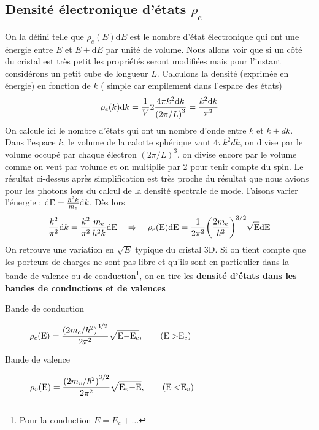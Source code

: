 	\subsection{Densité électronique d'états $\rho_e$}	
	On la défini telle que $\rho_e(E)\text{d}E$ est le nombre d'état électronique qui ont une 
	énergie entre $E$ et $E+\text{d}E$ par unité de volume. Nous allons voir que si un côté du 
	cristal est très petit les propriétés seront modifiées mais pour l'instant considérons un 
	petit cube de longueur $L$. Calculons la densité (exprimée en énergie) en fonction de $k$ (
	simple car empilement dans l'espace des états)
	\begin{equation}
	{\rho _e}(k){\rm{d}}k = \frac{1}{V}2\frac{{4\pi {k^2}{\rm{d}}k}}{{{{(2\pi /L)}^3}}} = \frac{{{k^2}{\rm{d}}k}}{{{\pi ^2}}}
	\end{equation}
	On calcule ici le nombre d'états qui ont un nombre d'onde entre $k$ et $k+dk$. Dans l'espace 
	$k$, le volume de la calotte sphérique vaut $4\pi k^2dk$, on divise par le volume occupé par 
	chaque électron $(2\pi/L)^3$, on divise encore par le volume comme on veut par volume et on 
	multiplie par 2 pour tenir compte du spin. Le résultat ci-dessus après simplification est très
	proche du résultat que nous avions pour les photons lors du calcul de la densité spectrale de 
	mode. Faisons varier l'énergie : ${\rm{dE}} = \frac{{{\hbar ^2}k}}{{{m_e}}}{\rm{d}}k$. Dès lors
	\begin{equation}
	\frac{{{k^2}}}{{{\pi ^2}}}{\rm{d}}k = \frac{{{k^2}}}{{{\pi ^2}}}\frac{{{m_e}}}{{{\hbar ^2}k}}{\rm{dE}}\quad\Rightarrow\quad {\rho _e}({\rm{E}}){\rm{dE}} = \frac{1}{{2{\pi ^2}}}{\left( {\frac{{2{m_e}}}{{{\hbar ^2}}}} \right)^{3/2}}\sqrt {\rm{E}} {\rm{dE}}
	\end{equation}
	On retrouve une variation en $\sqrt{E}$ typique du cristal 3D. Si on tient compte que les 
	porteurs de charges ne sont pas libre et qu'ils sont en particulier dans la bande de valence 
	ou de conduction\footnote{Pour la conduction $E=E_c+\dots$}, on en tire les \textbf{densité 
	d'états dans les bandes de conductions et de valences}
	\begin{description}
	\item[Bande de conduction] $\displaystyle {\rho _c}({\rm{E}}) = \frac{{{{(2{m_c}/{\hbar ^2})}^{3/2}}}}
	{{2{\pi ^2}}}\sqrt {{\rm{E - }}{{\rm{E}}_c}} ,{\rm{     \qquad( E  >  }}{{\rm{E}}_c})$
	\item[Bande de valence]	$\displaystyle {\rho _v}({\rm{E}}) = \frac{{{{(2{m_v}/{\hbar ^2})}^{3/2}}}}{{2{\pi ^2}}}\sqrt {{{\rm{E}}_v}{\rm{ - E}}} ,{\rm{    \qquad ( E  <  }}{{\rm{E}}_v})$
	\end{description}
	
